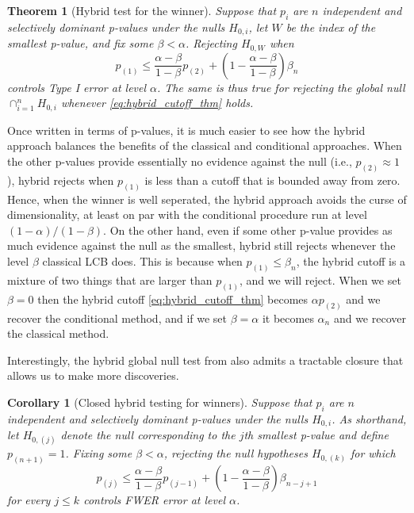 \documentclass{article}
\newtheorem{theorem}{Theorem}
\newtheorem{corollary}{Corollary}
\begin{document}
\begin{theorem}[Hybrid test for the winner]
    \label{thm:hyb}
    Suppose that $p_i$ are $n$ independent and selectively dominant p-values under the nulls $H_{0, i}$, let $W$ be the index of the smallest p-value, and fix some $\beta < \alpha$. Rejecting $H_{0, W}$ when 
    \begin{equation}
        \label{eq:hybrid_cutoff_thm}
        p_{(1)} \leq \frac{\alpha-\beta}{1-\beta}p_{(2)}  + \left(1 - \frac{\alpha - \beta}{1 - \beta}\right) \beta_n
    \end{equation} 
    controls Type I error at level $\alpha$. The same is thus true for rejecting the global null $\cap_{i=1}^n H_{0, i}$ whenever \eqref{eq:hybrid_cutoff_thm} holds.   
\end{theorem}

Once written in terms of p-values, it is much easier to see how the hybrid approach balances the benefits of the classical and conditional approaches.  When the other p-values provide essentially no evidence against the null (i.e., $p_{(2)} \approx 1$), hybrid rejects when $p_{(1)}$ is less than a cutoff that is bounded away from zero. Hence, when the winner is well seperated, the hybrid approach avoids the curse of dimensionality, at least on par with the conditional procedure run at level  $(1-\alpha)/(1-\beta)$. On the other hand, even if some other p-value provides as much evidence against the null as the smallest, hybrid still rejects whenever the level $\beta$ classical LCB does. This is because when $p_{(1)} \leq \beta_n$, the hybrid cutoff is a mixture of two things that are larger than $p_{(1)}$, and we will reject. When we set $\beta = 0$ then the hybrid cutoff \eqref{eq:hybrid_cutoff_thm} becomes $\alpha p_{(2)}$ and we recover the conditional method, and if we set $\beta=\alpha$ it becomes $\alpha_n$ and we recover the classical method. 

Interestingly, the hybrid global null test from  also admits a tractable closure that allows us to make more discoveries. 

\begin{corollary}[Closed hybrid testing for winners]
    \label{cor:hyb_closed}
    Suppose that $p_i$ are $n$ independent and selectively dominant p-values under the nulls $H_{0, i}$. As shorthand, let $H_{0, (j)}$ denote the null corresponding to the $j$th smallest p-value and define $p_{(n+1)} = 1$. Fixing some $\beta < \alpha$, rejecting the null hypotheses $H_{0, (k)}$ for which
    \begin{equation*}
        p_{(j)} \leq \frac{\alpha - \beta}{1-\beta} p_{(j-1)} + \left(1 - \frac{\alpha - \beta}{1-\beta} \right) \beta_{n - j + 1}   
    \end{equation*}
    for every $j \leq k$ controls FWER error at level $\alpha$. 
\end{corollary}
\end{document}
